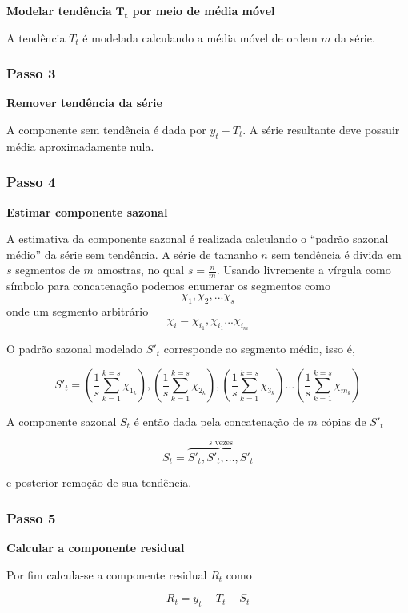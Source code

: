 \textbf{Modelar tendência }$\mathbf{T_t}$\textbf{ por meio de média móvel}

A tendência $T_t$ é modelada calculando a média móvel de ordem $m$ da
série.

\subsubsection{Passo 3}

\textbf{Remover tendência da série}

A componente sem tendência é dada por $y_t - T_t$. A série resultante deve
possuir média aproximadamente nula.

\subsubsection{Passo 4}

\textbf{Estimar componente sazonal}

A estimativa da componente sazonal é realizada calculando o ``padrão sazonal
médio'' da série sem tendência. A série de tamanho $n$ sem tendência é divida
em $s$ segmentos de $m$ amostras, no qual $s = \frac{n}{m}$. Usando livremente
a vírgula como símbolo para concatenação podemos enumerar os segmentos como
$$\chi_1, \chi_2, ... \chi_s$$ onde um segmento arbitrário $$\chi_i =
\chi_{i_{1}}, \chi_{i_{1}} ... \chi_{i_{m}}$$

O padrão sazonal modelado $S'_t$ corresponde ao segmento médio, isso é,

$$ S'_t = \left(\frac{1}{s} \sum_{k=1}^{k=s} \chi_{1_{k}}\right), \left(\frac{1}{s} \sum_{k=1}^{k=s} \chi_{2_{k}}\right), \left(\frac{1}{s} \sum_{k=1}^{k=s} \chi_{3_{k}}\right) \hdots \left(\frac{1}{s} \sum_{k=1}^{k=s} \chi_{m_{k}}\right)$$

A componente sazonal $S_t$ é então dada pela concatenação de $m$ cópias de
$S'_t$

$$ S_t = \overbrace{S'_t, S'_t, \hdots, S'_t}^{s\text{ vezes}} $$

e posterior remoção de sua tendência.

\subsubsection{Passo 5}

\textbf{Calcular a componente residual}

Por fim calcula-se a componente residual $R_t$ como

$$ R_t = y_t - T_t - S_t $$

